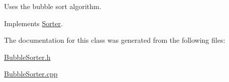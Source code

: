 Uses the bubble sort algorithm. 

Implements \hyperlink{class_sorter_a946276dc986c9f017e84986c74e7cf18}{Sorter}.



The documentation for this class was generated from the following files\+:\begin{DoxyCompactItemize}
\item 
\hyperlink{_bubble_sorter_8h}{Bubble\+Sorter.\+h}\item 
\hyperlink{_bubble_sorter_8cpp}{Bubble\+Sorter.\+cpp}\end{DoxyCompactItemize}
